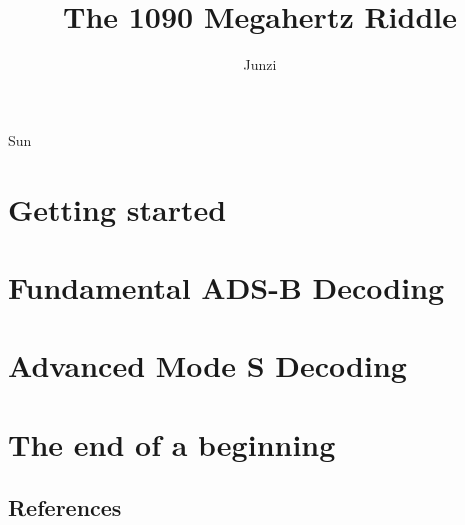 \documentclass[openany]{r1090}                %
\date{}
\newcommand\1{\texttt{1}}
\newcommand\0{\texttt{0}}
\begin{document}
\title[A Guide to Decoding and Interpreting ADS-B and Other Mode S Signals]{The 1090 Megahertz Riddle}
\author{Junzi}{Sun}





\dedication{
  This book is dedicated to my sons: William and Vincent
}

\setcounter{tocdepth}{1}
\tableofcontents



\part{Getting started}



\part{Fundamental ADS-B Decoding}









\part{Advanced Mode S Decoding}










\part{The end of a beginning}



\chapter*{References}
\printbibliography[heading=none]

% 
% 

\end{document}
